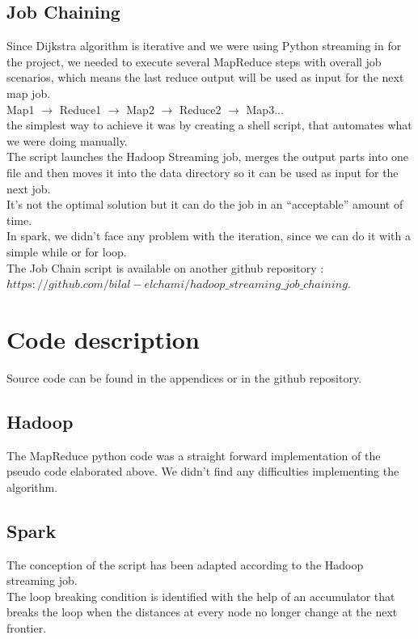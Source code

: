 \documentclass[english]{article}
\begin{document}
\newpage
\subsection{Job Chaining}
Since Dijkstra algorithm is iterative and we were using Python streaming in for the project, we needed to execute several MapReduce steps with overall job scenarios, which means the last reduce output will be used as input for the next map job.\\

Map1 $\rightarrow$ Reduce1 $\rightarrow$ Map2 $\rightarrow$ Reduce2 $\rightarrow$ Map3... \\


 the simplest way to achieve it was by creating a shell script, that automates what we were doing manually.\\

The script launches the Hadoop Streaming job, merges the output parts into one file and then moves it into the data directory so it can be used as input for the next job.\\

It’s not the optimal solution but it can do the job in an “acceptable” amount of time.\\

In spark, we didn't face any problem with the iteration, since we can do it with a simple while or for loop.\\

The Job Chain script is available on another github repository : \\
\href{https://github.com/bilal-elchami/hadoop_streaming_job_chaining}{$https://github.com/bilal-elchami/hadoop\_streaming\_job\_chaining$}.

\newpage
\section{Code description} 
Source code can be found in the appendices or in the github repository.\\
\subsection{Hadoop}
The MapReduce python code was a straight forward implementation of the pseudo code elaborated above. We didn't find any difficulties implementing the algorithm. 
\subsection{Spark}
The conception of the script has been adapted according to the Hadoop streaming job. \\
The loop breaking condition is identified with the help of an accumulator that breaks the loop when the distances at every node no longer change at the next frontier.\\
\end{document}
